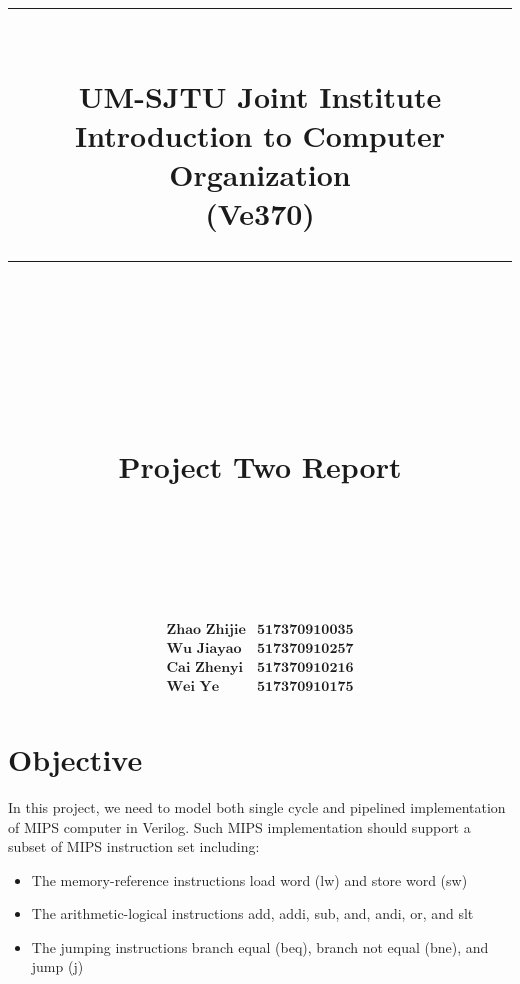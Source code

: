 \documentclass{article}[12pt]
\author{}
\begin{document}
\begin{titlepage}
\setmainfont{Copperplate Gothic Light}
	\title{ ~\\ \hrule~\\ UM-SJTU Joint Institute \\Introduction to Computer Organization\\(Ve370)\vspace{3mm}\\ \hrule ~\\~\\~\\~\\ Project Two Report\\~\\~\\}
		\date{}
	\maketitle
	\vspace{3.5cm}
	\begin{equation*}
    \begin{array}{lr}
     	\textbf{Zhao Zhijie}    &  \textbf{517370910035}\\
       \textbf{Wu Jiayao}  & \textbf{517370910257}\\
       \textbf{Cai Zhenyi}&\textbf{517370910216}\\
		\textbf{Wei Ye}&\textbf{517370910175}\\
    \end{array}
	\end{equation*}

	\setmainfont{Times New Roman}
	\thispagestyle{empty}
\end{titlepage}
	
	\tableofcontents
	\newpage
	\section{Objective}
	In this project, we need to model both single cycle and pipelined implementation of MIPS computer in Verilog. Such MIPS implementation should support a subset of MIPS instruction set including:
	\begin{itemize}
		\item The memory-reference instructions load word (lw) and store word (sw)
		\item The arithmetic-logical instructions add, addi, sub, and, andi, or, and slt
		\item The jumping instructions branch equal (beq), branch not equal (bne), and jump (j)
	\end{itemize}
\end{document}
